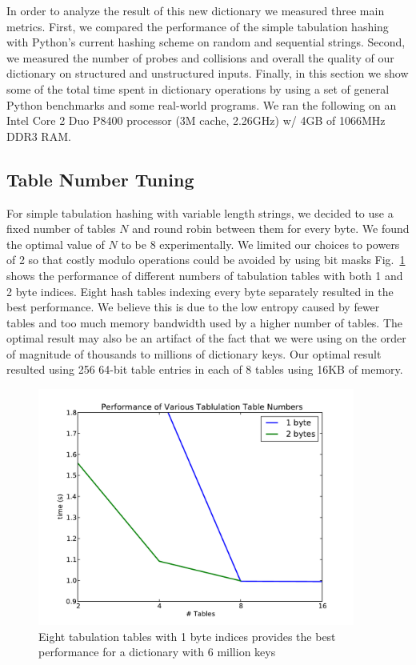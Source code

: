 \documentclass[runningheads,a4paper]{llncs}
\begin{document}
In order to analyze the result of this new dictionary we measured three main
metrics. First, we compared the performance of the simple tabulation hashing
with Python's current hashing scheme on random and sequential strings. Second, we measured the number of probes and collisions and overall the quality of our dictionary on structured and unstructured inputs. Finally, in this section  we show some of the total time spent in dictionary operations by using a set of general Python benchmarks and some real-world programs.  We ran the following on an Intel Core 2 Duo P8400 processor (3M cache, 2.26GHz) w/ 4GB of 1066MHz DDR3 RAM.
\subsection{Table Number Tuning}

For simple tabulation hashing with variable length strings, we decided to use a
fixed number of tables $N$ and round robin between them for every byte.  We
found the optimal value of $N$ to be 8 experimentally.  We limited our choices
to powers of 2 so that costly modulo operations could be avoided by using bit
masks Fig.~\ref{fig:tables} shows the performance of different numbers of
tabulation tables with both 1 and 2 byte indices.  Eight hash tables indexing
every byte separately resulted in the best performance.    We believe this is due
to the low entropy caused by fewer tables and too much memory bandwidth used by a higher
number of tables.  The optimal result may also be an artifact of the fact that
we were using on the order of magnitude of thousands to millions of dictionary
keys.  Our optimal result resulted using 256 64-bit table entries in each of 8 tables using 16KB of memory.
 \begin{figure}
   \centering
   \includegraphics[width=4.1in]{tables.pdf}
   \caption{Eight tabulation tables with 1 byte indices provides the best performance for a
   dictionary with 6 million keys}
   \label{fig:tables}
 \end{figure}
       
\end{document}
